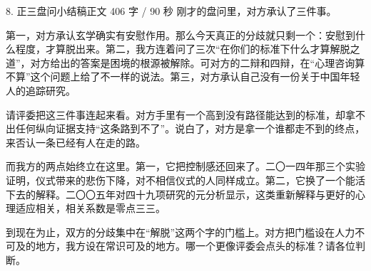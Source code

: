 \documentclass[script,pro]{debate}
\begin{document}
\begin{speech}{8. 正三盘问小结稿}{正文 406 字 / 90 秒}
刚才的盘问里，对方承认了三件事。

第一，对方承认玄学确实有安慰作用。那么今天真正的分歧就只剩一个：安慰到什么程度，才算脱出来。第二，我方连着问了三次“在你们的标准下什么才算解脱之道”，对方给出的答案是困境的根源被解除。可对方的二辩和四辩，在“心理咨询算不算”这个问题上给了不一样的说法。第三，对方承认自己没有一份关于中国年轻人的追踪研究。

请评委把这三件事连起来看。对方手里有一个高到没有路径能达到的标准，却拿不出任何纵向证据支持“这条路到不了”。说白了，对方是拿一个谁都走不到的终点，来否认一条已经有人在走的路。

而我方的两点始终立在这里。第一，它把控制感还回来了。二〇一四年那三个实验证明，仪式带来的悲伤下降，对不相信仪式的人同样成立。第二，它换了一个能活下去的解释。二〇〇五年对四十九项研究的元分析显示，这类重新解释与更好的心理适应相关，相关系数是零点三三。

到现在为止，双方的分歧集中在“解脱”这两个字的门槛上。对方把门槛设在人力不可及的地方，我方设在常识可及的地方。哪一个更像评委会点头的标准？请各位判断。

\end{speech}
\end{document}
